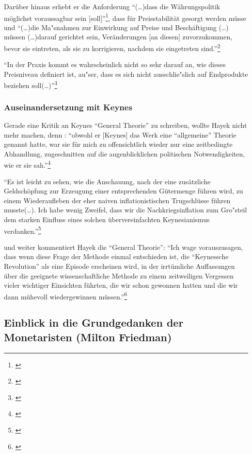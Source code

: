 \documentclass[
        onecolumn,
        a4paper,
        abstracton,
        parskip=half
        ,final
        ]{scrartcl}
\begin{document}
Dar{\"u}ber hinaus erhebt er die Anforderung "`(\ldots)dass die W{\"a}hrungspolitik m{\"o}glichst voraussagbar sein [soll]"'\footnote[423]{\citep*[S.420]{hayek1971}}, dass f{\"u}r Preisstabilit{\"a}t gesorgt werden m{\"u}sse und "`(\ldots)die Ma{"s}nahmen zur Einwirkung auf Preise und Besch{\"a}ftigung (\ldots) m{\"u}ssen (\ldots)darauf gerichtet sein, Ver{\"a}nderungen [an diesen] zuvorzukommen, bevor sie eintreten, als sie zu korrigieren, nachdem sie eingetreten sind."'\footnote[425]{\citep*[S.422]{hayek1971}}

"`In der Praxis kommt es wahrscheinlich nicht so sehr darauf an, wie dieses Preisniveau definiert ist, au{"s}er, dass es sich nicht ausschlie{"s}lich auf Endprodukte beziehen soll(\ldots)"'\footnote[426]{\citep*[S.423]{hayek1971}}

\subsubsection{Auseinandersetzung mit Keynes}

Gerade eine Kritik an Keynes "`General Theorie"' zu schreiben, wollte Hayek nicht mehr machen, denn : "`obwohl er [Keynes] das Werk eine "`allgemeine"' Theorie genannt hatte, war sie f{\"u}r mich zu offensichtlich wieder nur eine zeitbedingte Abhandlung, zugeschnitten auf die augenblicklichen politischen Notwendigkeiten, wie er sie sah."'\footnote[427]{\citep*[S.91]{Hayek1969}}

"`Es ist leicht zu sehen, wie die Anschauung, nach der eine zus{\"a}tzliche Geldsch{\"o}pfung zur Erzeugung einer entsprechenden G{\"u}termenge f{\"u}hren wird, zu einem Wiederaufleben der eher naiven inflationistischen Trugschl{\"u}sse f{\"u}hren musste(\ldots). Ich habe wenig Zweifel, dass wir die Nachkriegsinflation zum Gro{"s}teil dem starken Einfluss eines solchen {\"u}bervereinfachten Keynesianismus verdanken."'\footnote[428]{\citep*[S.93]{Hayek1969}}

und weiter kommentiert Hayek die "`General Theorie"':
"`Ich wage vorauszusagen, dass wenn diese Frage der Methode einmal entschieden ist, die "`Keynessche Revolution"' als eine Episode erscheinen wird, in der irrt{\"u}mliche Auffassungen {\"u}ber die geeignete wissenschaftliche Methode zu einem zeitweiligen Vergessen vieler wichtiger Einsichten f{\"u}hrten, die wir schon gewonnen hatten und die wir dann m{\"u}hevoll wiedergewinnen m{\"u}ssen."'\footnote[429]{\citep*[S.96]{Hayek1969}}

\subsection{Einblick in die Grundgedanken der Monetaristen (Milton Friedman)} %
\end{document}
